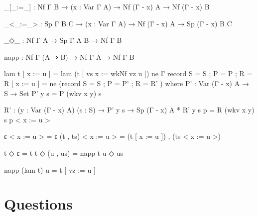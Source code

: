 \begin{code}
_[_:=_] : Nf Γ B → (x : Var Γ A) → Nf (Γ - x) A → Nf (Γ - x) B

_<_:=_> : Sp Γ B C → (x : Var Γ A) → Nf (Γ - x) A → Sp (Γ - x) B C

_◇_ : Nf Γ A → Sp Γ A B → Nf Γ B

napp : Nf Γ (A ⇒ B) → Nf Γ A → Nf Γ B
\end{code}

\begin{code}[hide]
lam t [ x := u ] = lam (t [ vs x := wkNf vz u ])
ne {Γ} record { S = S ; P = P ; R = R } [ x := u ] =
  ne (record { S = S ; P = P' ; R = R' })
  where
  P' : Var (Γ - x) A → S → Set
  P' y s = P (wkv x y) s

  R' : (y : Var (Γ - x) A) (s : S) → P' y s → Sp (Γ - x) A *
  R' y s p = R (wkv x y) s p < x := u >
  
ε < x := u > = ε
(t , ts) < x := u > = (t [ x := u ]) , (ts < x := u >)

t ◇ ε = t
t ◇ (u , us) = napp t u ◇ us

napp (lam t) u = t [ vz := u ]
\end{code}

\section{Questions}
